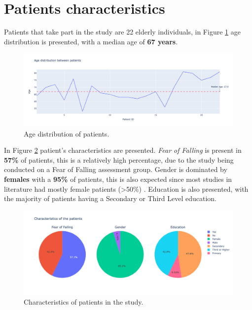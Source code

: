     \newpage 

    \section{Patients characteristics}
        Patients that take part in the study are 22 elderly individuals, in Figure \ref{fig:age_distribution} age distribution is presented, with a median age of \textbf{67 years}. 

        \begin{figure}[H]
            \centering
            \includegraphics[width=1.0\textwidth]{./resources/plots/patients/age.png}
            \caption{Age distribution of patients.}
            \label{fig:age_distribution}
        \end{figure}

        In Figure \ref{fig:patients_characteristics} patient's characteristics are presented. \textit{Fear of Falling} is present in \textbf{57\%} of patients, this is a relatively high percentage, due to the study being conducted on a Fear of Falling assessment group. Gender is dominated by \textbf{females} with a \textbf{95\%} of patients, this is also expected since most studies in literature had mostly female patients (>50\%) \cite{mackay_fear_2021}. Education is also presented, with the majority of patients having a Secondary or Third Level education.
        
        \begin{figure}[H]
            \centering
            \includegraphics[width=1.0\textwidth]{./resources/plots/patients/chars.png}
            \caption{Characteristics of patients in the study.}
            \label{fig:patients_characteristics}
        \end{figure}

